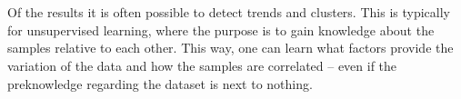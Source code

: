 \\\\
Of the results it is often possible to detect trends and clusters. This is typically for unsupervised learning, where the purpose is to gain knowledge about the samples relative to each other. This way, one can learn what factors provide the variation of the data and how the samples are correlated – even if the preknowledge regarding the dataset is next to nothing. 
\begin{figure}[H]
  \newcommand*\FigVSkip{0.5em}
  \newcommand*\FigHSkip{0.1em}
  \newsavebox\FigBox
  \centering
  \begin{minipage}{\wd\FigBox}
    \centering\usebox{\FigBox}
  \end{minipage}
  \begin{minipage}{\wd\FigBox}

\end{minipage}
\end{figure}
